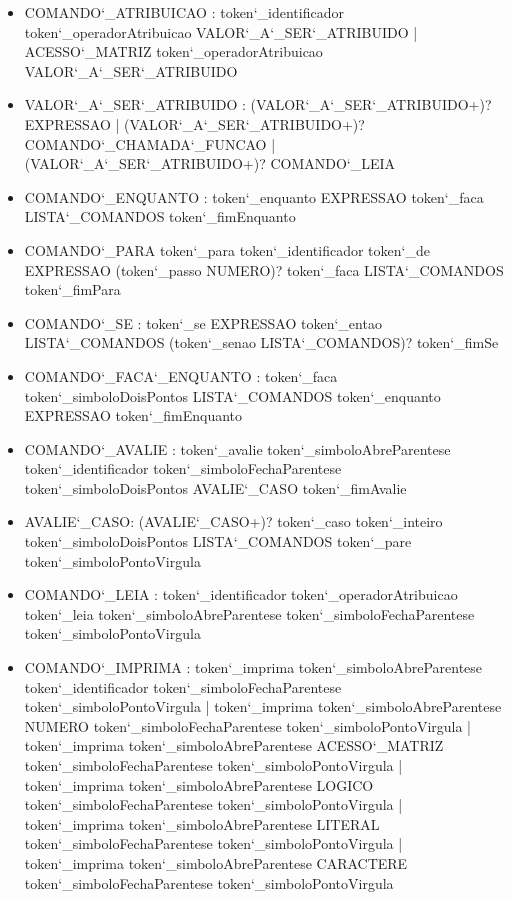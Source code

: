 \documentclass[
12pt,				%
a4paper,			%
english,			%
french,				%
spanish,			%
brazil,				%
article
]{abntex2}
\begin{document}
\begin{itemize}
	\item COMANDO\char`_ATRIBUICAO : token\char`_identificador token\char`_operadorAtribuicao VALOR\char`_A\char`_SER\char`_ATRIBUIDO | ACESSO\char`_MATRIZ token\char`_operadorAtribuicao VALOR\char`_A\char`_SER\char`_ATRIBUIDO
	
	\item VALOR\char`_A\char`_SER\char`_ATRIBUIDO : (VALOR\char`_A\char`_SER\char`_ATRIBUIDO+)? EXPRESSAO |  (VALOR\char`_A\char`_SER\char`_ATRIBUIDO+)? COMANDO\char`_CHAMADA\char`_FUNCAO  |  (VALOR\char`_A\char`_SER\char`_ATRIBUIDO+)? COMANDO\char`_LEIA
	
	\item COMANDO\char`_ENQUANTO : token\char`_enquanto EXPRESSAO token\char`_faca LISTA\char`_COMANDOS token\char`_fimEnquanto
	\item COMANDO\char`_PARA token\char`_para token\char`_identificador token\char`_de EXPRESSAO (token\char`_passo NUMERO)? token\char`_faca LISTA\char`_COMANDOS token\char`_fimPara
	\item COMANDO\char`_SE : token\char`_se EXPRESSAO token\char`_entao LISTA\char`_COMANDOS (token\char`_senao LISTA\char`_COMANDOS)? token\char`_fimSe
	\item COMANDO\char`_FACA\char`_ENQUANTO : token\char`_faca token\char`_simboloDoisPontos LISTA\char`_COMANDOS token\char`_enquanto EXPRESSAO token\char`_fimEnquanto
	\item COMANDO\char`_AVALIE : token\char`_avalie token\char`_simboloAbreParentese token\char`_identificador token\char`_simboloFechaParentese token\char`_simboloDoisPontos AVALIE\char`_CASO token\char`_fimAvalie
	\item AVALIE\char`_CASO: (AVALIE\char`_CASO+)? token\char`_caso token\char`_inteiro token\char`_simboloDoisPontos LISTA\char`_COMANDOS token\char`_pare token\char`_simboloPontoVirgula
	\item COMANDO\char`_LEIA : token\char`_identificador token\char`_operadorAtribuicao token\char`_leia token\char`_simboloAbreParentese token\char`_simboloFechaParentese token\char`_simboloPontoVirgula
	
	\item COMANDO\char`_IMPRIMA : token\char`_imprima token\char`_simboloAbreParentese token\char`_identificador token\char`_simboloFechaParentese token\char`_simboloPontoVirgula | token\char`_imprima token\char`_simboloAbreParentese NUMERO token\char`_simboloFechaParentese token\char`_simboloPontoVirgula | token\char`_imprima token\char`_simboloAbreParentese ACESSO\char`_MATRIZ token\char`_simboloFechaParentese token\char`_simboloPontoVirgula | token\char`_imprima token\char`_simboloAbreParentese LOGICO token\char`_simboloFechaParentese token\char`_simboloPontoVirgula | token\char`_imprima token\char`_simboloAbreParentese LITERAL token\char`_simboloFechaParentese token\char`_simboloPontoVirgula | token\char`_imprima token\char`_simboloAbreParentese CARACTERE token\char`_simboloFechaParentese token\char`_simboloPontoVirgula
	 

\end{itemize}
\end{document}
